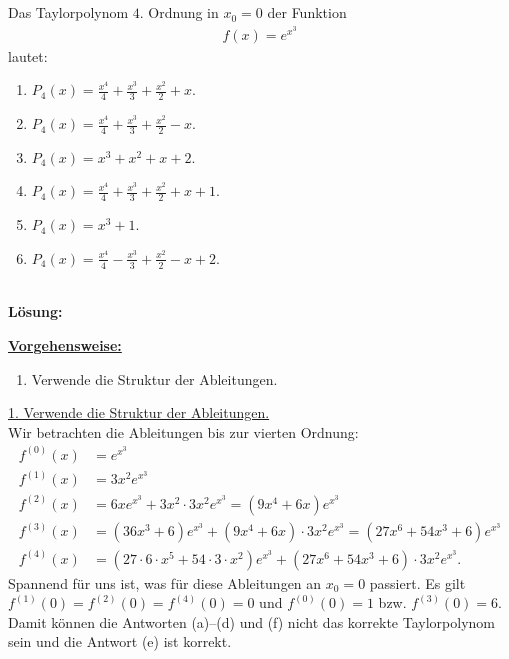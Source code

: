 \subsection*{}
Das Taylorpolynom $ 4 $. Ordnung in $ x_0 = 0 $ der Funktion
\begin{align*}
	f(x) = e^{x^3}
\end{align*}
lautet:
\renewcommand{\labelenumi}{(\alph{enumi})}
\begin{enumerate}
	\item 
	$ P_4(x) = \frac{x^4}{4} + \frac{x^3}{3} + \frac{x^2}{2} + x $. 
	\item
	$ P_4(x) = \frac{x^4}{4} + \frac{x^3}{3} + \frac{x^2}{2} - x $. 
	\item
	$ P_4(x) = x^3 + x^2 + x + 2$. 
	\item
	$ P_4(x) = \frac{x^4}{4} + \frac{x^3}{3} + \frac{x^2}{2} + x +1 $. 
	\item
	$ P_4(x) = x^3 + 1$. 
	\item
	$ P_4(x) = \frac{x^4}{4} - \frac{x^3}{3} + \frac{x^2}{2} - x + 2 $. 
\end{enumerate}
\ \\
\textbf{Lösung:}
\begin{mdframed}
	\underline{\textbf{Vorgehensweise:}}
	\renewcommand{\labelenumi}{\theenumi.}
	\begin{enumerate}
		\item Verwende die Struktur der Ableitungen.
	\end{enumerate}
\end{mdframed}

\underline{1. Verwende die Struktur der Ableitungen.}\\
Wir betrachten die Ableitungen bis zur vierten Ordnung:
\begin{align*}
	f^{(0)}(x) &= e^{x^3}\\
	f^{(1)}(x) &= 3x^2 e^{x^3}\\
	f^{(2)}(x) &= 6x e^{x^3} + 3x^2 \cdot 3x^2 e^{x^3} = (9x^4 + 6x) e^{x^3}\\
	f^{(3)}(x) &= (36x^3+ 6) e^{x^3} + (9x^4 + 6x) \cdot 3 x^2 e^{x^3} 
	= (27x^6 + 54x^3 + 6) e^{x^3}\\
	f^{(4)}(x) &= (27 \cdot 6\cdot x^5+54 \cdot 3 \cdot x^2) e^{x^3}
	+ (27x^6 + 54x^3 + 6)\cdot 3 x^2 e^{x^3}.
\end{align*}
Spannend für uns ist, was für diese Ableitungen an $ x_0 = 0 $ passiert.
Es gilt $ f^{(1)}(0) = f^{(2)}(0) = f^{(4)}(0) = 0  $ und $ f^{(0)}(0) = 1 $ bzw. $ f^{(3)}(0) = 6 $.
Damit können die Antworten (a)--(d) und (f) nicht das korrekte Taylorpolynom sein und die Antwort (e) ist korrekt.

